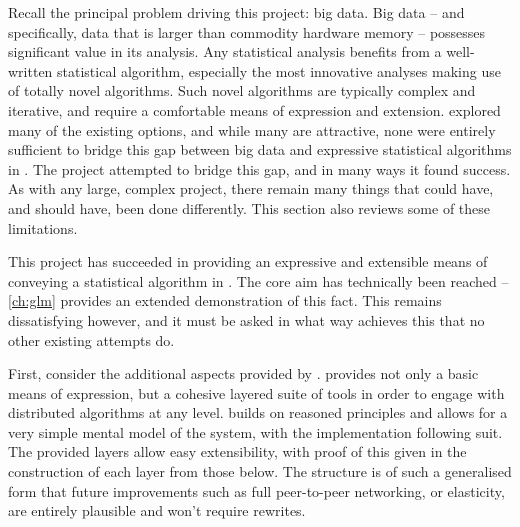 Recall the principal problem driving this project: big data.
Big data -- and specifically, data that is larger than commodity hardware memory -- possesses significant value in its analysis.
Any statistical analysis benefits from a well-written statistical algorithm, especially the most innovative analyses making use of totally novel algorithms.
Such novel algorithms are typically complex and iterative, and require a comfortable means of expression and extension.
 explored many of the existing options, and while many are attractive, none were entirely sufficient to bridge this gap between big data and expressive statistical algorithms in \R{}.
The \lsr{} project attempted to bridge this gap, and in many ways it found success.
As with any large, complex project, there remain many things that could have, and should have, been done differently.
This section also reviews some of these limitations.

This project has succeeded in providing an expressive and extensible means of conveying a statistical algorithm in \R{}.
The core aim has technically been reached -- \cref{ch:glm} provides an extended demonstration of this fact.
This remains dissatisfying however, and it must be asked in what way \lsr{} achieves this that no other existing attempts do.

First, consider the additional aspects provided by \lsr{}.
\lsr{} provides not only a basic means of expression, but a cohesive layered suite of tools in order to engage with distributed algorithms at any level.
\lsr{} builds on reasoned principles and allows for a very simple mental model of the system, with the implementation following suit.
The provided layers allow easy extensibility, with proof of this given in the construction of each layer from those below.
The structure is of such a generalised form that future improvements such as full peer-to-peer networking, or elasticity, are entirely plausible and won't require rewrites.


